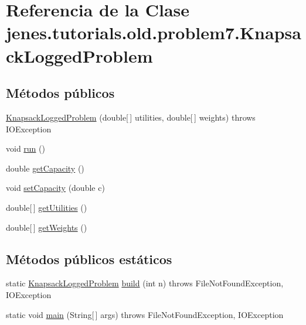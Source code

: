 \hypertarget{classjenes_1_1tutorials_1_1old_1_1problem7_1_1_knapsack_logged_problem}{\section{Referencia de la Clase jenes.\-tutorials.\-old.\-problem7.\-Knapsack\-Logged\-Problem}
\label{classjenes_1_1tutorials_1_1old_1_1problem7_1_1_knapsack_logged_problem}
}
\subsection*{Métodos públicos}
\begin{DoxyCompactItemize}
\item 
\hyperlink{classjenes_1_1tutorials_1_1old_1_1problem7_1_1_knapsack_logged_problem_a29a58dbca9c08a57879396daab5f3572}{Knapsack\-Logged\-Problem} (double\mbox{[}$\,$\mbox{]} utilities, double\mbox{[}$\,$\mbox{]} weights)  throws I\-O\-Exception 
\item 
void \hyperlink{classjenes_1_1tutorials_1_1old_1_1problem7_1_1_knapsack_logged_problem_a56e70b4e2ab15b82fee574fd3221e1c9}{run} ()
\item 
double \hyperlink{classjenes_1_1tutorials_1_1old_1_1problem7_1_1_knapsack_logged_problem_a929b6e393d0da3396bd235b10996a1a7}{get\-Capacity} ()
\item 
void \hyperlink{classjenes_1_1tutorials_1_1old_1_1problem7_1_1_knapsack_logged_problem_af8fef0686eac745e86c82e000d8056f8}{set\-Capacity} (double c)
\item 
double\mbox{[}$\,$\mbox{]} \hyperlink{classjenes_1_1tutorials_1_1old_1_1problem7_1_1_knapsack_logged_problem_a6f9e4d8876f6df43cfbd03f8981cf2e2}{get\-Utilities} ()
\item 
double\mbox{[}$\,$\mbox{]} \hyperlink{classjenes_1_1tutorials_1_1old_1_1problem7_1_1_knapsack_logged_problem_a544b9df22c87570cbbe5636ba3af9a10}{get\-Weights} ()
\end{DoxyCompactItemize}
\subsection*{Métodos públicos estáticos}
\begin{DoxyCompactItemize}
\item 
static \hyperlink{classjenes_1_1tutorials_1_1old_1_1problem7_1_1_knapsack_logged_problem}{Knapsack\-Logged\-Problem} \hyperlink{classjenes_1_1tutorials_1_1old_1_1problem7_1_1_knapsack_logged_problem_a978e0862b0d51bed33093b0739bdf3ef}{build} (int n)  throws File\-Not\-Found\-Exception, I\-O\-Exception 
\item 
static void \hyperlink{classjenes_1_1tutorials_1_1old_1_1problem7_1_1_knapsack_logged_problem_a6c304e5e2b49231b6868e15b87b406da}{main} (String\mbox{[}$\,$\mbox{]} args)  throws File\-Not\-Found\-Exception, I\-O\-Exception 
\end{DoxyCompactItemize}


